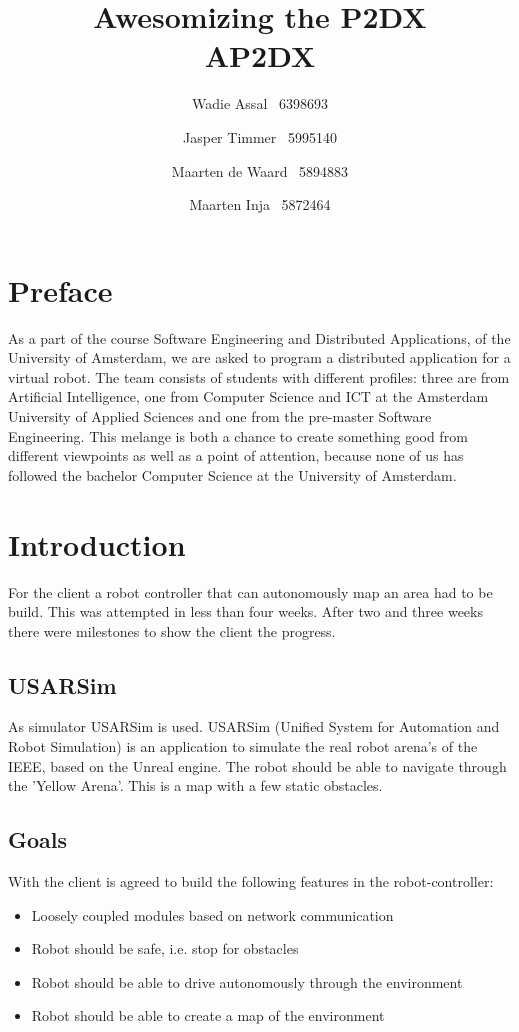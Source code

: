 \documentclass[titlepage, a4paper,10pt]{article}
\title{Awesomizing the P2DX\\\small AP2DX}
\author{Wadie Assal \ 6398693 \and Jasper Timmer \ 5995140 \and Maarten de Waard \ 5894883 \and  Maarten Inja \ 5872464}
\begin{document}
\maketitle

\tableofcontents
\newpage


\section{Preface}
As a part of the course Software Engineering and Distributed Applications, of
the University of Amsterdam, we are asked to program a distributed application
for a virtual robot. The team consists of students with different profiles:
three are from Artificial Intelligence, one from Computer Science and ICT at the
Amsterdam University of Applied Sciences and one from the pre-master Software
Engineering. This melange is both a chance to create something good from
different viewpoints as well as a point of attention, because none of us has
followed the bachelor Computer Science at the University of Amsterdam. 

\newpage

\section{Introduction}
For the client a robot controller that can autonomously map an area had to be build. This was attempted in less than four weeks. After two and three weeks there were milestones to show the client the progress.

\subsection{USARSim}
As simulator USARSim is used. USARSim (Unified System for Automation and Robot Simulation) is an application to simulate the real robot arena's of the IEEE, based on the Unreal engine. The robot should be able to navigate through the 'Yellow Arena'. This is a map with a few static obstacles.

\subsection{Goals}
With the client is agreed to build the following features in the robot-controller:
\begin{itemize}
\item Loosely coupled modules based on network communication
\item Robot should be safe, i.e. stop for obstacles
\item Robot should be able to drive autonomously through the environment
\item Robot should be able to create a map of the environment
\end{itemize}
\end{document}
